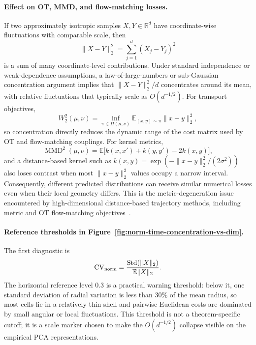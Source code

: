 \paragraph{Effect on OT, MMD, and flow-matching losses.}
If two approximately isotropic samples \(X,Y\in\mathbb{R}^d\) have coordinate-wise fluctuations with comparable scale, then
\begin{equation}
  \|X-Y\|_2^2 = \sum_{j=1}^{d} (X_j-Y_j)^2
\end{equation}
is a sum of many coordinate-level contributions. Under standard independence or weak-dependence assumptions, a law-of-large-numbers or sub-Gaussian concentration argument implies that \(\|X-Y\|_2^2/d\) concentrates around its mean, with relative fluctuations that typically scale as \(O(d^{-1/2})\). For transport objectives,
\begin{equation}
  W_2^2(\mu,\nu)
  = \inf_{\pi\in\Pi(\mu,\nu)}
    \mathbb{E}_{(x,y)\sim\pi}\|x-y\|_2^2,
\end{equation}
so concentration directly reduces the dynamic range of the cost matrix used by OT and flow-matching couplings. For kernel metrics,
\begin{equation}
  \operatorname{MMD}^2(\mu,\nu)
  =
  \mathbb{E}\big[k(x,x')+k(y,y')-2k(x,y)\big],
\end{equation}
and a distance-based kernel such as \(k(x,y)=\exp(-\|x-y\|_2^2/(2\sigma^2))\) also loses contrast when most \(\|x-y\|_2^2\) values occupy a narrow interval. Consequently, different predicted distributions can receive similar numerical losses even when their local geometry differs. This is the metric-degeneration issue encountered by high-dimensional distance-based trajectory methods, including metric and OT flow-matching objectives~\citep{kapusniak2024metric}.

\paragraph{Reference thresholds in Figure~\ref{fig:norm-time-concentration-vs-dim}.}
The first diagnostic is
\begin{equation}
  \operatorname{CV}_{\rm norm}
  =
  \frac{\operatorname{Std}(\|X\|_2)}{\mathbb{E}\|X\|_2}.
\end{equation}
The horizontal reference level \(0.3\) is a practical warning threshold: below it, one standard deviation of radial variation is less than \(30\%\) of the mean radius, so most cells lie in a relatively thin shell and pairwise Euclidean costs are dominated by small angular or local fluctuations. This threshold is not a theorem-specific cutoff; it is a scale marker chosen to make the \(O(d^{-1/2})\) collapse visible on the empirical PCA representations.

